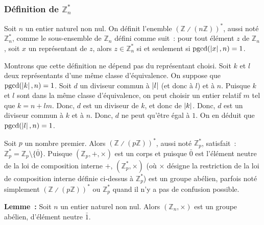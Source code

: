 \subsubsection{Définition de \texorpdfstring{$\mathbb{Z}_n^*$}{Zn*}}

Soit $n$ un entier naturel non nul. 
On définit l'enemble $\left( \mathbb{Z} \divslash (n \mathbb{Z}) \right)^*$, aussi noté $\mathbb{Z}_n^*$, comme le sous-ensemble de $\mathbb{Z}_n$ défini comme suit : pour tout élément $z$ de $\mathbb{Z}_n$, soit $x$ un représentant de $z$, alors $z \in \mathbb{Z}_n^*$ si et seulement si $\mathrm{pgcd}(\left\lvert x \right\rvert, n) = 1$.

Montrons que cette définition ne dépend pas du représentant choisi. 
Soit $k$ et $l$ deux représentants d'une même classe d'équivalence. 
On suppose que $\mathrm{pgcd}(\left\lvert k \right\rvert, n) = 1$.
Soit $d$ un diviseur commun à $\left\lvert l \right\rvert$ (et donc à $l$) et à $n$. 
Puisque $k$ et $l$ sont dans la même classe d'équivalence, on peut choisir un entier relatif $m$ tel que $k = n + l m$.
Donc, $d$ est un diviseur de $k$, et donc de $\left\lvert k \right\rvert$. 
Donc, $d$ est un diviseur commun à $k$ et à $n$. 
Donc, $d$ ne peut qu'être égal à $1$.
On en déduit que $\mathrm{pgcd}(\left\lvert l \right\rvert, n) = 1$.

Soit $p$ un nombre premier. 
Alors $\left( \mathbb{Z} \divslash (p \mathbb{Z}) \right)^*$, aussi noté $\mathbb{Z}_p^*$, satisfait : $\mathbb{Z}_p^* = \mathbb{Z}_p \setminus \lbrace \bar{0} \rbrace$.
Puisque $\left(\mathbb{Z}_p, +, \times \right)$ est un corps et puisque $\bar{0}$ est l'élément neutre de la loi de composition interne $+$, $\left( \mathbb{Z}_p^*, \times \right)$ (où $\times$ désigne la restriction de la loi de composition interne définie ci-dessus à $\mathbb{Z}_p^*$) est un groupe abélien, parfois noté simplement $\left( \mathbb{Z} \divslash (p \mathbb{Z}) \right)^*$ ou $\mathbb{Z}_p^*$ quand il n'y a pas de confusion possible.

\medskip

\noindent
\textbf{Lemme :} Soit $n$ un entier naturel non nul. Alors $\left( \mathbb{Z}_n, \times \right)$ est un groupe abélien, d'élément neutre $\bar{1}$.

\medskip

